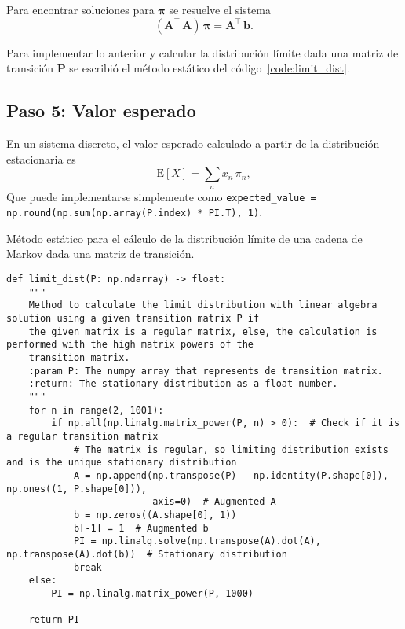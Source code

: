 Para encontrar soluciones para $\boldsymbol{\pi}$ se resuelve el sistema
\begin{equation}
    \label{eq:pi_linear_system}
    \left(\mathbf{A}^\intercal\,\mathbf{A}\right)\,\boldsymbol{\pi} = \mathbf{A}^\intercal\,\mathbf{b}.
\end{equation}

Para implementar lo anterior y calcular la distribución límite dada una matriz de transición $\mathbf{P}$ se escribió el método estático del código~\ref{code:limit_dist}.

\subsection*{Paso 5: Valor esperado}
\label{subsec:expected_value}

En un sistema discreto, el valor esperado calculado a partir de la distribución estacionaria es
%
\begin{equation}
    \mathrm{E}[X] = \sum_n x_n\,\pi_n,
\end{equation}
%
Que puede implementarse simplemente como \texttt{expected_value = np.round(np.sum(np.array(P.index) * PI.T), 1)}.

\begin{code}
    \caption{Método estático para el cálculo de la distribución límite de una cadena de Markov dada una matriz de transición.}
    \label{code:limit_dist}
    \centering
    \begin{verbatim}
def limit_dist(P: np.ndarray) -> float:
    """
    Method to calculate the limit distribution with linear algebra solution using a given transition matrix P if
    the given matrix is a regular matrix, else, the calculation is performed with the high matrix powers of the
    transition matrix.
    :param P: The numpy array that represents de transition matrix.
    :return: The stationary distribution as a float number.
    """
    for n in range(2, 1001):
        if np.all(np.linalg.matrix_power(P, n) > 0):  # Check if it is a regular transition matrix
            # The matrix is regular, so limiting distribution exists and is the unique stationary distribution
            A = np.append(np.transpose(P) - np.identity(P.shape[0]), np.ones((1, P.shape[0])),
                          axis=0)  # Augmented A
            b = np.zeros((A.shape[0], 1))
            b[-1] = 1  # Augmented b
            PI = np.linalg.solve(np.transpose(A).dot(A), np.transpose(A).dot(b))  # Stationary distribution
            break
    else:
        PI = np.linalg.matrix_power(P, 1000)

    return PI
    \end{verbatim}
\end{code}

